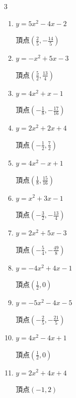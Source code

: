 \begin{multicols}{3}
\begin{enumerate}
  \item $\displaystyle y=5x^{2}-4x-2$

        $\displaystyle 頂点\left( \frac{2}{5} , -\frac{14}{5} \right)$

  \item $\displaystyle y=-x^{2}+5x-3$

        $\displaystyle 頂点\left( \frac{5}{2} , \frac{13}{4} \right)$

  \item $\displaystyle y=4x^{2}+x-1$

        $\displaystyle 頂点\left( -\frac{1}{8} , -\frac{17}{16} \right)$

  \item $\displaystyle y=2x^{2}+2x+4$

        $\displaystyle 頂点\left( -\frac{1}{2} , \frac{7}{2} \right)$

\columnbreak %

\resetques

  \item $\displaystyle y=4x^{2}-x+1$

        $\displaystyle 頂点\left( \frac{1}{8} , \frac{15}{16} \right)$

  \item $\displaystyle y=x^{2}+3x-1$

        $\displaystyle 頂点\left( -\frac{3}{2} , -\frac{13}{4} \right)$

  \item $\displaystyle y=2x^{2}+5x-3$

        $\displaystyle 頂点\left( -\frac{5}{4} , -\frac{49}{8} \right)$

  \item $\displaystyle y=-4x^{2}+4x-1$

        $\displaystyle 頂点\left( \frac{1}{2} , 0 \right)$

  \item $\displaystyle y=-5x^{2}-4x-5$

        $\displaystyle 頂点\left( -\frac{2}{5} , -\frac{21}{5} \right)$

\columnbreak %

  \item $\displaystyle y=4x^{2}-4x+1$

        $\displaystyle 頂点\left( \frac{1}{2} , 0 \right)$

  \item $\displaystyle y=2x^{2}+4x+4$

        $\displaystyle 頂点\left( -1 , 2 \right)$


\end{enumerate}
\end{multicols}
